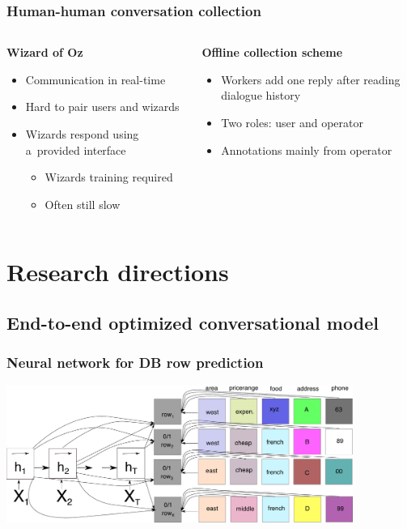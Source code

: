 \documentclass[10pt, compress,british,xcolor={svgnames,dvipsnames,x11names},trans]{beamer}
\begin{document}
\begin{frame}\frametitle{Human-human conversation collection}
\begin{columns}
\begin{column}{0.45\textwidth}
    {\bf Wizard of Oz} \\
    \begin{itemize}
        \item Communication in real-time 
        \item Hard to pair users and wizards
        \item Wizards respond using a~provided interface
            \begin{itemize}
                \item Wizards training required 
                \item Often still slow  
            \end{itemize}
    \end{itemize}
\end{column}
\begin{column}{0.45\textwidth}
    {\bf Offline collection scheme}
    \begin{itemize}
        \item Workers add one reply after reading dialogue history  
        \item Two roles: user and operator 
        \item Annotations mainly from operator
    \end{itemize}
\end{column}
\end{columns}
\end{frame}



\section{Research directions}  %

\subsection{End-to-end optimized conversational model}

\begin{frame}\frametitle{Neural network for DB row prediction}
    \includegraphics[width=0.85\textwidth]{./e2end_dbclassifiers}
\end{frame}
\end{document}

